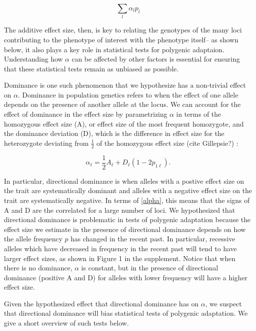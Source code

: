 \documentclass[a4paper,11pt]{article}
\newcommand{\jb}[1]{{\color{blue} (#1)} }
\begin{document}
\begin{equation}
  \sum_l{\alpha_lp_l}
\end{equation}

The additive effect size, then, is key to relating the genotypes of
the many loci contributing to the phenotype of interest with the
phenotype itself-- as shown below, it also plays a key role in statistical tests for
polygenic adaptaion. Understanding how $\alpha$ can be
affected by other factors is essential for ensuring that these
statistical tests remain as unbiased as possible. 

Dominance is one such phenomenon that we hypothesize has a non-trivial
effect on $\alpha$. Dominance in population genetics refers to when the effect of one
allele depends on the presence of another allele at the locus. We can account for
the effect of dominance in the effect size by parametrizing $\alpha$
in terms of the homozygous effect size (A), or effect size of the most frequent homozygote, and the
dominance deviation (D), which is the difference in effect size for the heterozygote
deviating from $\frac{1}{2}$ of the homozygous effect size \jb{cite Gillepsie?}:

\begin{equation}  
  \alpha_\ell = \frac{1}{2} A_\ell + D_\ell\left(1-2p_{1\ell}\right).
  \label{alpha}
\end{equation}

In particular, directional dominance is when alleles with a postive effect
size on the trait are systematically dominant and alleles with a
negative effect size on the trait are systematically negative. In
terms of \eqref{alpha}, this means that the signs of A and D are the
correlated for a large number of loci. We hypothesized that
directional dominance is problematic in tests of polygenic adaptation
because the effect size we estimate in the presence of directional
dominance depends on how the allele frequency $p$ has changed in the
recent past. In particular, recessive alleles which have decreased in frequency
in the recent past will tend to have larger effect sizes, as shown in
Figure 1 in the supplement. Notice that when there is no dominance,
$\alpha$ is constant, but in the presence of directional dominance
(positive A and D) for alleles with lower frequency will have a higher
effect size. 

Given the hypothesized effect that directional dominance has on
$\alpha$, we suspect that directional dominance will bias statistical
tests of polygenic adaptation. We give a short overview of such tests
below.  
\end{document}
